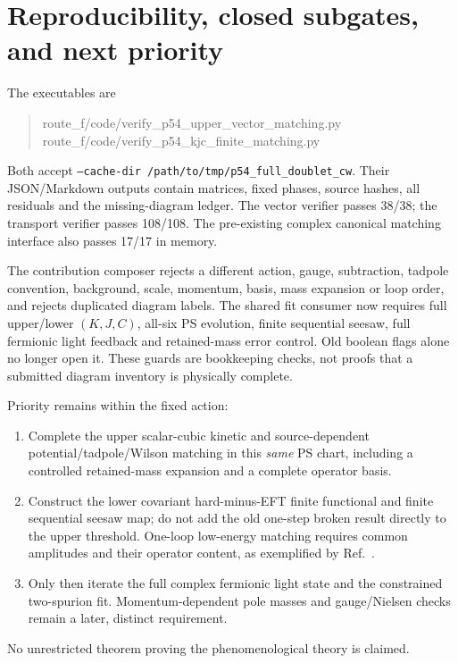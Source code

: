 \documentclass[11pt]{article}
\begin{document}
\section{Reproducibility, closed subgates, and next priority}
The executables are
\begin{quote}\small\ttfamily
route\_f/code/verify\_p54\_upper\_vector\_matching.py\\
route\_f/code/verify\_p54\_kjc\_finite\_matching.py
\end{quote}
Both accept \texttt{--cache-dir /path/to/tmp/p54\_full\_doublet\_cw}.
Their JSON/Markdown outputs contain matrices, fixed phases, source
hashes, all residuals and the missing-diagram ledger. The vector verifier
passes 38/38; the transport verifier passes 108/108. The pre-existing
complex canonical matching interface also passes 17/17 in memory.

The contribution composer rejects a different action, gauge,
subtraction, tadpole convention, background, scale, momentum, basis,
mass expansion or loop order, and rejects duplicated diagram labels.
The shared fit consumer now requires full upper/lower $(K,J,C)$, all-six
PS evolution, finite sequential seesaw, full fermionic light feedback and
retained-mass error control. Old boolean flags alone no longer open it.
These guards are bookkeeping checks, not proofs that a submitted diagram
inventory is physically complete.

Priority remains within the fixed action:
\begin{enumerate}
 \item Complete the upper scalar-cubic kinetic and source-dependent
 potential/tadpole/Wilson matching in this \emph{same} PS chart, including
 a controlled retained-mass expansion and a complete operator basis.
 \item Construct the lower covariant hard-minus-EFT finite functional and
 finite sequential seesaw map; do not add the old one-step broken result
 directly to the upper threshold. One-loop low-energy matching requires
 common amplitudes and their operator content, as exemplified by
 Ref.~\cite{dekens}.
 \item Only then iterate the full complex fermionic light state and the
 constrained two-spurion fit. Momentum-dependent pole masses and
 gauge/Nielsen checks remain a later, distinct requirement.
\end{enumerate}
No unrestricted theorem proving the phenomenological theory is claimed.
\end{document}
